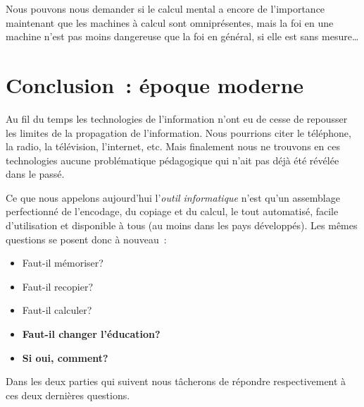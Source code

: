 Nous pouvons nous demander si le calcul mental a encore de l'importance maintenant que les machines à calcul sont omniprésentes, mais la foi en une machine n'est pas moins dangereuse que la foi en général, si elle est sans mesure\ldots


\chapter*{Conclusion~: époque moderne}

Au fil du temps les technologies de l'information n'ont eu de cesse de repousser les limites de la propagation de l'information. Nous pourrions citer le téléphone, la radio, la télévision, l'internet, etc. Mais finalement nous ne trouvons en ces technologies aucune problématique pédagogique qui n'ait pas déjà été révélée dans le passé.

Ce que nous appelons aujourd'hui l'\emph{outil informatique} n'est qu'un assemblage perfectionné de l'encodage, du copiage et du calcul, le tout automatisé, facile d'utilisation et disponible à tous (au moins dans les pays développés). Les mêmes questions se posent donc à nouveau~:

\begin{itemize}
\Large
\item Faut-il mémoriser?

\item Faut-il recopier?

\item Faut-il calculer?

\item \textbf{Faut-il changer l'éducation?}

\item \textbf{Si oui, comment?}

\end{itemize}

Dans les deux parties qui suivent nous tâcherons de répondre respectivement à ces deux dernières questions.